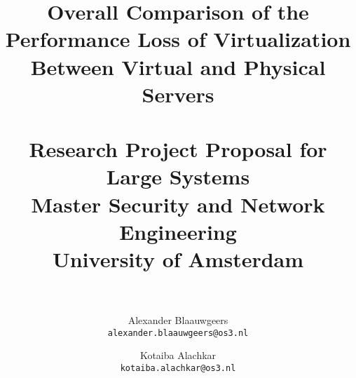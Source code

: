 \documentclass[a4paper, 12pt, one column]{article}
\title{ Overall Comparison of the Performance
Loss of Virtualization Between Virtual and Physical Servers  \\~\\
\large Research Project Proposal for Large Systems
\\Master Security and Network Engineering \\ University of Amsterdam\\~\\}
\author{Alexander Blaauwgeers \\ \texttt{alexander.blaauwgeers@os3.nl} \and Kotaiba Alachkar   \\ \texttt{kotaiba.alachkar@os3.nl}}
\begin{document}
\maketitle
\clearpage
\begin{multicols}{2}
















\end{multicols}

\nocite{*}
\printbibliography
\end{document}
